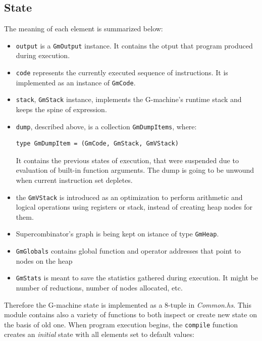 \documentclass[12pt,a4paper]{report}
\begin{document}
\subsection{State}
The meaning of each element is summarized below:
\begin{itemize}
  \item \texttt{output} is a \texttt{GmOutput} instance. It contains the otput
    that program produced during execution.
  \item \texttt{code} represents the currently executed sequence of
    instructions. It is implemented as an instance of \texttt{GmCode}.
  \item \texttt{stack}, \texttt{GmStack} instance, implements the G-machine's runtime
    stack and keeps the spine of expression.
  \item \texttt{dump}, described above, is a collection \texttt{GmDumpItems},
    where:

    \vspace*{0.2in}
    \begin{lstlisting}[style=haskell]
      type GmDumpItem = (GmCode, GmStack, GmVStack)
    \end{lstlisting}
    It contains the previous states of execution, that were suspended due to
    evaluation of built-in function arguments. The dump is going to be unwound
    when current instruction set depletes.
  \item the \texttt{GmVStack} is introduced as an optimization to perform
    arithmetic and logical operations using registers or stack, instead of creating
    heap nodes for them.
  \item Supercombinator's graph is being kept on istance of type
    \texttt{GmHeap}.
  \item \texttt{GmGlobals} contains global function and operator addresses that
    point to nodes on the heap
  \item \texttt{GmStats} is meant to save the statistics gathered during
    execution. It might be number of reductions, number of nodes allocated,
    etc.

\end{itemize}

Therefore the G-machine state is implemented as a 8-tuple in
\textit{Common.hs}. This module contains also a variety of functions to both
inspect or create new state on the basis of old one. When program execution
begins, the \texttt{compile} function creates an \textit{initial} state with
all elements set to default values:
\end{document}
